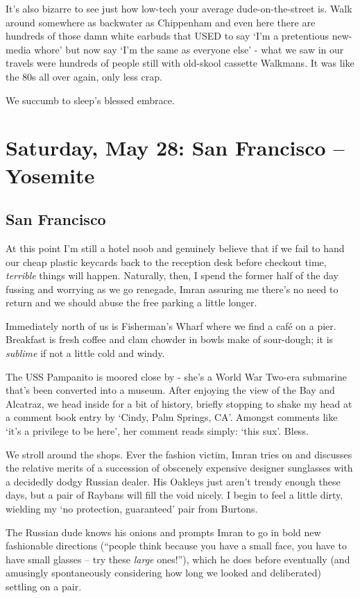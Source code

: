 \documentclass[a5paper,titlepage,11pt]{book}
\begin{document}
It's also bizarre to see just how low-tech your average dude-on-the-street is.  Walk around somewhere as backwater as Chippenham and even here there are hundreds of those damn white earbuds that USED to say `I'm a pretentious new-media whore' but now say `I'm the same as everyone else' - what we saw in our travels were hundreds of people still with old-skool cassette Walkmans.  It was like the 80s all over again, only less crap.

We succumb to sleep's blessed embrace.

\chapter[San Francisco -- Yosemite]{Saturday, May 28: San Francisco -- Yosemite}
\section*{San Francisco}
At this point I'm still a hotel noob and genuinely believe that if we fail to hand our cheap plastic keycards back to the reception desk before checkout time, \emph{terrible} things will happen.  Naturally, then, I spend the former half of the day fussing and worrying as we go renegade, Imran assuring me there's no need to return and we should abuse the free parking a little longer.

Immediately north of us is Fisherman's Wharf where we find a caf\'{e} on a pier.  Breakfast is fresh coffee and clam chowder in bowls make of sour-dough; it is \emph{sublime} if not a little cold and windy.

The USS Pampanito is moored close by - she's a World War Two-era submarine that's been converted into a museum. After enjoying the view of the Bay and Alcatraz, we head inside for a bit of history, briefly stopping to shake my head at a comment book entry by `Cindy, Palm Springs, CA'.  Amongst comments like `it's a privilege to be here', her comment reads simply: `this sux'.  Bless.

We stroll around the shops.  Ever the fashion victim, Imran tries on and discusses the relative merits of a succession of obscenely expensive designer sunglasses with a decidedly dodgy Russian dealer.  His Oakleys just aren't trendy enough these days, but a pair of Raybans will fill the void nicely.  I begin to feel a little dirty, wielding my  `no protection, guaranteed' pair from Burtons.

The Russian dude knows his onions and prompts Imran to go in bold new fashionable directions (``people think because you have a small face, you have to have small glasses -- try these \emph{large} ones!''), which he does before eventually (and amusingly spontaneously considering how long we looked and deliberated) settling on a pair.
\end{document}
